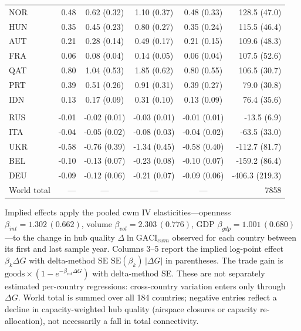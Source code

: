 \begin{table}[t]
\begin{threeparttable}
\begin{tabular}{lrcccr}
NOR & 0.48 & 0.62 (0.32) & 1.10 (0.37) & 0.48 (0.33) & 128.5 (47.0) \\
HUN & 0.35 & 0.45 (0.23) & 0.80 (0.27) & 0.35 (0.24) & 115.5 (46.4) \\
AUT & 0.21 & 0.28 (0.14) & 0.49 (0.17) & 0.21 (0.15) & 109.6 (48.3) \\
FRA & 0.06 & 0.08 (0.04) & 0.14 (0.05) & 0.06 (0.04) & 107.5 (52.6) \\
QAT & 0.80 & 1.04 (0.53) & 1.85 (0.62) & 0.80 (0.55) & 106.5 (30.7) \\
PRT & 0.39 & 0.51 (0.26) & 0.91 (0.31) & 0.39 (0.27) & 79.0 (30.8) \\
IDN & 0.13 & 0.17 (0.09) & 0.31 (0.10) & 0.13 (0.09) & 76.4 (35.6) \\
\addlinespace
\multicolumn{6}{l}{\emph{Connectivity decliners (bottom 5)}}\\
RUS & -0.01 & -0.02 (0.01) & -0.03 (0.01) & -0.01 (0.01) & -13.5 (6.9) \\
ITA & -0.04 & -0.05 (0.02) & -0.08 (0.03) & -0.04 (0.02) & -63.5 (33.0) \\
UKR & -0.58 & -0.76 (0.39) & -1.34 (0.45) & -0.58 (0.40) & -112.7 (81.7) \\
BEL & -0.10 & -0.13 (0.07) & -0.23 (0.08) & -0.10 (0.07) & -159.2 (86.4) \\
DEU & -0.09 & -0.12 (0.06) & -0.21 (0.07) & -0.09 (0.06) & -406.3 (219.3) \\
\midrule
World total & --- & --- & --- & --- & 7858 \\
\bottomrule
\end{tabular}
\begin{tablenotes}\scriptsize
\item Implied effects apply the pooled cwm IV elasticities---openness
$\beta_{int}=1.302\,(0.662)$, volume $\beta_{vol}=2.303\,(0.776)$, GDP
$\beta_{gdp}=1.001\,(0.680)$---to the change in hub quality
$\Delta\ln\mathrm{GACI}_{cwm}$ observed for each country between its first and
last sample year. Columns 3--5 report the implied log-point effect
$\beta_k\Delta G$ with delta-method SE $\mathrm{SE}(\beta_k)\,|\Delta G|$ in
parentheses. The trade gain is
$\text{goods}\times(1-e^{-\beta_{int}\Delta G})$ with delta-method SE. These are
not separately estimated per-country regressions: cross-country variation enters
only through $\Delta G$. World total is summed over all 184 countries; negative
entries reflect a decline in capacity-weighted hub quality (airspace closures or
capacity re-allocation), not necessarily a fall in total connectivity.
\end{tablenotes}
\end{threeparttable}
\end{table}


